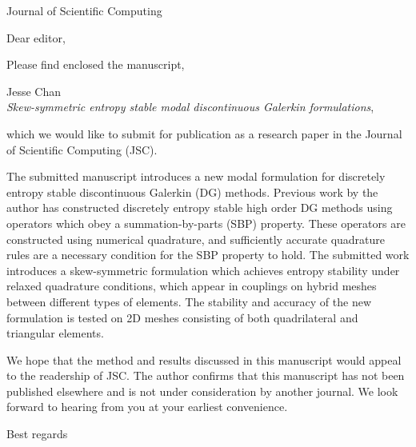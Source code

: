 \documentclass{letter}
\begin{document}
\begin{letter}{Journal of Scientific Computing}


\opening{Dear editor,}

Please find enclosed the manuscript, 
\begin{center}
Jesse Chan\\
\textit{Skew-symmetric entropy stable modal discontinuous Galerkin formulations},
\end{center}
which we would like to submit for publication as a research paper in the Journal of Scientific Computing (JSC).  

The submitted manuscript introduces a new modal formulation for discretely entropy stable discontinuous Galerkin (DG) methods.  Previous work by the author has constructed discretely entropy stable high order DG methods using operators which obey a summation-by-parts (SBP) property.  These operators are constructed using numerical quadrature, and sufficiently accurate quadrature rules are a necessary condition for the SBP property to hold.  The submitted work introduces a skew-symmetric formulation which achieves entropy stability under relaxed quadrature conditions, which appear in couplings on hybrid meshes between different types of elements.  The stability and accuracy of the new formulation is tested on 2D meshes consisting of both quadrilateral and triangular elements.  

We hope that the method and results discussed in this manuscript would appeal to the readership of JSC.  The author confirms that this manuscript has not been published elsewhere and is not under consideration by another journal.  We look forward to hearing from you at your earliest convenience.  

\closing{Best regards}

\end{letter}
\end{document}
